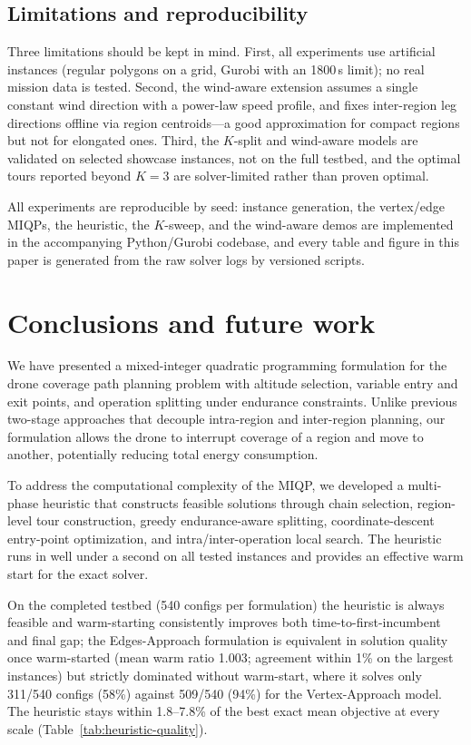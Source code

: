 \documentclass[12pt]{elsarticle}
\begin{document}
\subsection{Limitations and reproducibility}
\label{sec:limitations}

Three limitations should be kept in mind.  First, all experiments use artificial instances (regular polygons on a grid, Gurobi with an 1800\,s limit); no real mission data is tested.  Second, the wind-aware extension assumes a single constant wind direction with a power-law speed profile, and fixes inter-region leg directions offline via region centroids---a good approximation for compact regions but not for elongated ones.  Third, the $K$-split and wind-aware models are validated on selected showcase instances, not on the full testbed, and the optimal tours reported beyond $K=3$ are solver-limited rather than proven optimal.

All experiments are reproducible by seed: instance generation, the vertex/edge MIQPs, the heuristic, the $K$-sweep, and the wind-aware demos are implemented in the accompanying Python/Gurobi codebase, and every table and figure in this paper is generated from the raw solver logs by versioned scripts.

\section{Conclusions and future work}
\label{sec:conclusions}

We have presented a mixed-integer quadratic programming formulation for the drone coverage path planning problem with altitude selection, variable entry and exit points, and operation splitting under endurance constraints. Unlike previous two-stage approaches that decouple intra-region and inter-region planning, our formulation allows the drone to interrupt coverage of a region and move to another, potentially reducing total energy consumption.

To address the computational complexity of the MIQP, we developed a multi-phase heuristic that constructs feasible solutions through chain selection, region-level tour construction, greedy endurance-aware splitting, coordinate-descent entry-point optimization, and intra/inter-operation local search. The heuristic runs in well under a second on all tested instances and provides an effective warm start for the exact solver.

On the completed testbed (540 configs per formulation) the heuristic is always feasible and warm-starting consistently improves both time-to-first-incumbent and final gap; the Edges-Approach formulation is equivalent in solution quality once warm-started (mean warm ratio 1.003; agreement within 1\% on the largest instances) but strictly dominated without warm-start, where it solves only 311/540 configs (58\%) against 509/540 (94\%) for the Vertex-Approach model. The heuristic stays within 1.8--7.8\% of the best exact mean objective at every scale (Table~\ref{tab:heuristic-quality}).
\end{document}
